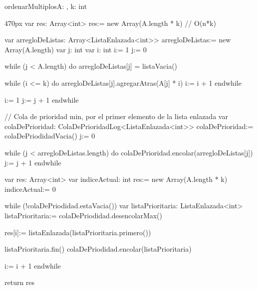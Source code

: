 \documentclass[10pt,a4paper]{article}
\begin{document}
\begin{proc}{ordenarMultiplos}{\In A: , \In k: int}{}
  \begin{ImplementationCode}{470px}
      var res: Array<int>
          res:= new Array(A.length * k) // O(n*k)

      var arregloDeListas: Array<ListaEnlazada<int>>
          arregloDeListas:= new Array(A.length)
      var j: int
      var i: int
          i:= 1
          j:= 0

      while (j < A.length) do
        arregloDeListas[j] = listaVacia()

        while (i <= k) do
          arregloDeListas[j].agregarAtras(A[j] * i)
          i:= i + 1
        endwhile

        i:= 1
        j:= j + 1
      endwhile

      // Cola de prioridad min, por el primer elemento de la lista enlazada
      var colaDePrioridad: ColaDePrioridadLog<ListaEnlazada<int>>
          colaDePrioridad:= colaDePriodidadVacia()
          j:= 0

      while (j < arregloDeListas.length) do
        colaDePrioridad.encolar(arregloDeListas[j])
        j:= j + 1
      endwhile

      var res: Array<int>
      var indiceActual: int
          res:= new Array(A.length * k)
          indiceActual:= 0

      while (!colaDePriodidad.estaVacia())
        var listaPrioritaria: ListaEnlazada<int>
            listaPrioritaria:= colaDePriodidad.desencolarMax()
        
        res[i]:= listaEnlazada(listaPrioritaria.primero())

        listaPrioritaria.fin()
        colaDePriodidad.encolar(listaPrioritaria)

        i:= i + 1
      endwhile

      return res
  \end{ImplementationCode}
\end{proc}
\newpage


\end{document}
